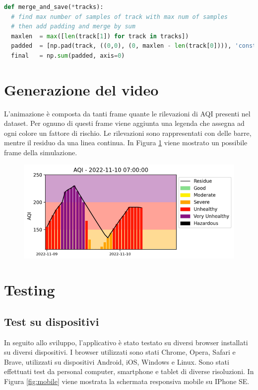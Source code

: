 \begin{lstlisting}[language=Python,caption={Aggiunta del padding.},label={lst:padding}]
def merge_and_save(*tracks):
  # find max number of samples of track with max num of samples
  # then add padding and merge by sum
  maxlen  = max([len(track[1]) for track in tracks])
  padded  = [np.pad(track, ((0,0), (0, maxlen - len(track[0]))), 'constant', constant_values=0) for track in tracks]
  final   = np.sum(padded, axis=0)
\end{lstlisting}



\section{Generazione del video}
L'animazione è composta da tanti frame quante le rilevazioni di AQI presenti nel dataset.
Per ognuno di questi frame viene aggiunta una legenda che assegna ad ogni colore un fattore di rischio.
Le rilevazioni sono rappresentati con delle barre, mentre il residuo da una linea continua.
In Figura \ref{fig:video} viene mostrato un possibile frame della simulazione.
\begin{figure}[h]
  \includegraphics[width=\linewidth]{img/video.PNG}
  \label{fig:video}
\end{figure}



\section{Testing}
\subsection{Test su dispositivi}
In seguito allo sviluppo, l'applicativo è stato testato su diversi browser installati su diversi dispositivi.
I browser utilizzati sono stati Chrome, Opera, Safari e Brave, utilizzati su dispositivi Android, iOS, Windows e Linux.
Sono stati effettuati test da personal computer, smartphone e tablet di diverse risoluzioni.
In Figura \ref{fig:mobile} viene mostrata la schermata responsiva mobile su IPhone SE.

